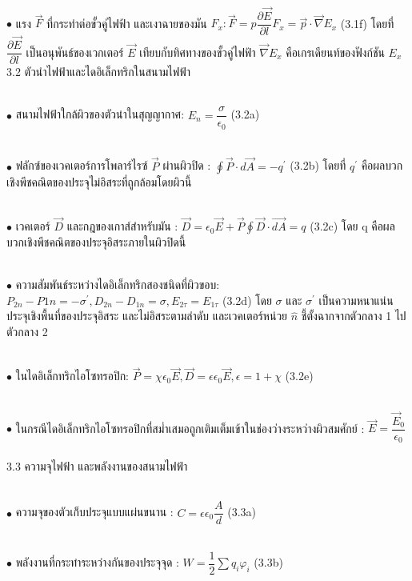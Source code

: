 \documentclass[a4paper,12pt]{article}
\begin{document}
~\\ $\bullet$    แรง $\vec F$ ที่กระทำต่อขั้วคู่ไฟฟ้า และเงาฉายของมัน $F_{x} :
\vec{F} = p\dfrac{\partial \vec{E}}{\partial l}                F_{x} = \vec{p}\cdot\vec{\nabla}E_{x}$                       (3.1f)
โดยที่ $\dfrac{\partial \vec{E}}{\partial l}$ เป็นอนุพันธ์ของเวกเตอร์ $\vec{E}$ เทียบกับทิศทางของขั้วคู่ไฟฟ้า   $\vec{\nabla}E_{x}$ คือเกรเดียนท์ของฟังก์ชัน $E_{x}$~\\
3.2 ตัวนำไฟฟ้าและไดอิเล็กทริกในสนามไฟฟ้า

~\\ $\bullet$ สนามไฟฟ้าใกล้ผิวของตัวนำในสุญญากาศ:
$E_{n} = \dfrac{\sigma}{\epsilon_{0}}$           (3.2a)

~\\ $\bullet$ ฟลักซ์ของเวคเตอร์การโพลาร์ไรซ์ $\vec{P}$ ผ่านผิวปิด :
$\displaystyle \oint \vec{P}\cdot d\vec{A} = - q^\prime$          (3.2b)
โดยที่ $q^\prime$  คือผลบวกเชิงพีชคณิตของประจุไม่อิสระที่ถูกล้อมโดยผิวนี้

~\\ $\bullet$ เวคเตอร์ $\vec{D}$ และกฎของเกาส์สำหรับมัน :
$\vec{D} = \epsilon_{0}\vec{E} + \vec{P}              \displaystyle \oint\vec{D}\cdot \vec{dA} = q$          (3.2c)
โดย q คือผลบวกเชิงพีชคณิตของประจุอิสระภายในผิวปิดนี้

~\\ $\bullet$ ความสัมพันธ์ระหว่างไดอิเล็กทริกสองชนิดที่ผิวขอบ:
$P_{2n} - P{1n} = -\sigma^\prime   ,      D_{2n} - D_{1n} = \sigma   ,      E_{2\tau} = E_{1\tau}$            (3.2d)
โดย $\sigma$  และ $\sigma^\prime$  เป็นความหนาแน่นประจุเชิงพื้นที่ของประจุอิสระ และไม่อิสระตามลำดับ และเวคเตอร์หน่วย $\hat{n}$ ชี้ตั้งฉากจากตัวกลาง 1 ไปตัวกลาง 2

~\\ $\bullet$ ในไดอิเล็กทริกไอโซทรอปิก:
$\vec{P} = \chi\epsilon_{0}\vec{E} ,   \vec{D} = \epsilon\epsilon_{0}\vec{E} ,   \epsilon = 1+\chi$            (3.2e)

~\\ $\bullet$ ในกรณีไดอิเล็กทริกไอโซทรอปิกที่สม่ำเสมอถูกเติมเต็มเข้าในช่องว่างระหว่างผิวสมศักย์ :
$\vec{E} = \dfrac{\vec{E}_{0}}{\epsilon_{0}}$~\\

3.3 ความจุไฟฟ้า และพลังงานของสนามไฟฟ้า

~\\ $\bullet$ ความจุของตัวเก็บประจุแบบแผ่นขนาน :
$C = \epsilon\epsilon_{0}\dfrac{A}{d}$                         (3.3a)

~\\ $\bullet$ พลังงานที่กระทำระหว่างกันของประจุจุด :
$W = \dfrac{1}{2}\displaystyle \sum q_{i}\varphi_{i}$                  (3.3b)
\end{document}
